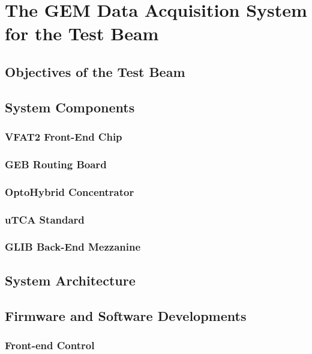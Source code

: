 \chapter{The GEM Data Acquisition System for the Test Beam}
\label{chap:test_beam}

    \section{Objectives of the Test Beam}

    \section{System Components}

        \subsection{VFAT2 Front-End Chip}

        \subsection{GEB Routing Board}

        \subsection{OptoHybrid Concentrator}

        \subsection{uTCA Standard}

        \subsection{GLIB Back-End Mezzanine}

    \section{System Architecture}

    \section{Firmware and Software Developments}

        \subsection{Front-end Control}

